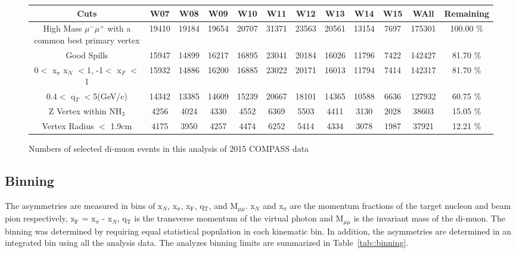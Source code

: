 \begin{figure}[h!t]
  \begin{adjustwidth}{-2cm}{}
    \begin{tabular}{ |c|c|c|c|c|c|c|c|c|c|c|c| }
      \hline \textbf{Cuts}& \textbf{W07}& \textbf{W08}& \textbf{W09}&
      \textbf{W10}& \textbf{W11}& \textbf{W12}& \textbf{W13}& \textbf{W14}&
      \textbf{W15} & \textbf{WAll} & \textbf{Remaining} \\ \hline

      \multirow{2}{13em}{High Mass $\mu^-\mu^+$ with a common best primary
        vertex}& 19410& 19184& 19654& 20707& 31371& 23563& 20561& 13154& 7697&
      175301& 100.00 \% \\ & & & & & & & & & & & \\ \hline
      
      Good Spills& 15947& 14899& 16217& 16895& 23041& 20184& 16026& 11796& 7422&
      142427& 81.70 \% \\ \hline

      0$<$ x$_{\pi}$ x$_N$ $<$1, -1$<$ x$_F$ $<$1& 15932& 14886& 16200& 16885&
      23022& 20171& 16013& 11794& 7414& 142317& 81.70 \% \\ \hline

      0.4$<$ q$_T$ $<$5(GeV/c)& 14342& 13385& 14609& 15239& 20667& 18101& 14365&
      10588& 6636& 127932& 60.75 \% \\ \hline

      Z Vertex within NH$_3$& 4256& 4024& 4330& 4552& 6369& 5503& 4411& 3130&
      2028& 38603& 15.05 \% \\ \hline

      Vertex Radius $<$ 1.9cm& 4175& 3950& 4257& 4474& 6252& 5414& 4334& 3078&
      1987& 37921& 12.21 \% \\ \hline
      
    \end{tabular}
    \caption{Numbers of selected di-muon events in this analysis of 2015 COMPASS
      data}
    \label{tab::EventTable}
  \end{adjustwidth}
\end{figure}

\subsection{Binning}
The asymmetries are measured in bins of x$_N$, x$_{\pi}$, x$_{\mathrm{F}}$,
q$_{\mathrm{T}}$, and M$_{\mu\mu}$. x$_N$ and x$_{\pi}$ are the momentum
fractions of the target nucleon and beam pion respectively, x$_{\mathrm{F}}$ =
x$_{\pi}$ - x$_N$, q$_{\mathrm{T}}$ is the transverse momentum of the virtual
photon and M$_{\mu\mu}$ is the invariant mass of the di-muon.  The binning was
determined by requiring equal statistical population in each kinematic bin.  In
addition, the asymmetries are determined in an integrated bin using all the
analysis data.  The analyzes binning limits are summarized in
Table~\ref{tab::binning}.

